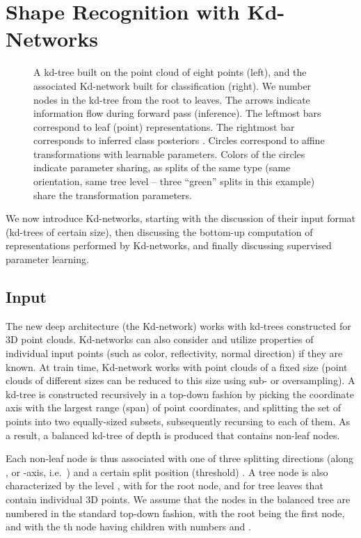 \documentclass[10pt,twocolumn,letterpaper]{article}
\begin{document}
\section{Shape Recognition with Kd-Networks}
\label{sect:method}

\begin{figure}
    \centering
    \caption{A kd-tree built on the point cloud of eight points (left), and the associated Kd-network built for classification (right). We number nodes in the kd-tree from the root to leaves. The arrows indicate information flow during forward pass (inference). The leftmost bars correspond to leaf (point) representations. The rightmost bar corresponds to inferred class posteriors .  Circles correspond to affine transformations with learnable parameters. Colors of the circles indicate parameter sharing, as splits of the same type (same orientation, same tree level -- three ``green'' splits in this example) share the transformation parameters.}
    \label{fig:kdnet}
\end{figure}

We now introduce Kd-networks, starting with the discussion of their input format (kd-trees of certain size), then discussing the bottom-up computation of representations performed by Kd-networks, and finally discussing supervised parameter learning.

\subsection{Input}
The new deep architecture (the Kd-network) works with kd-trees constructed for 3D point clouds. Kd-networks can also consider and utilize properties of individual input points (such as color, reflectivity, normal direction) if they are known. At train time, Kd-network works with point clouds of a fixed size  (point clouds of different sizes can be reduced to this size using sub- or oversampling). A kd-tree is constructed recursively in a top-down fashion by picking the coordinate axis with the largest range (span) of point coordinates, and splitting the set of points into two equally-sized subsets, subsequently recursing to each of them. As a result, a balanced kd-tree  of depth  is produced that contains  non-leaf nodes. 

Each non-leaf node  is thus associated with one of three splitting directions  (along ,  or -axis, i.e.\ ) and a certain split position (threshold) . A tree node is also characterized by the level , with  for the root node, and  for tree leaves that contain individual 3D points. We assume that the nodes in the balanced tree are numbered in the standard top-down fashion, with the root being the first node, and with the th node having children with numbers  and .
\end{document}
